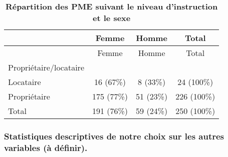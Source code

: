\documentclass[
]{article}
\begin{document}
\begin{longtable}[]{@{}lccc@{}}
\caption{\textbf{Répartition des PME suivant le niveau d'instruction et
le sexe}}\tabularnewline
\toprule\noalign{}
& Femme & Homme & Total \\
\midrule\noalign{}
\endfirsthead
\toprule\noalign{}
& Femme & Homme & Total \\
\midrule\noalign{}
\endhead
\bottomrule\noalign{}
\endlastfoot
Propriétaire/locataire & & & \\
Locataire & 16 (67\%) & 8 (33\%) & 24 (100\%) \\
Propriétaire & 175 (77\%) & 51 (23\%) & 226 (100\%) \\
Total & 191 (76\%) & 59 (24\%) & 250 (100\%) \\
\end{longtable}

\hypertarget{statistiques-descriptives-de-notre-choix-sur-les-autres-variables-uxe0-duxe9finir.}{%
\subsubsection{\texorpdfstring{\textbf{Statistiques descriptives de
notre choix sur les autres variables (à
définir).}}{Statistiques descriptives de notre choix sur les autres variables (à définir).}}\label{statistiques-descriptives-de-notre-choix-sur-les-autres-variables-uxe0-duxe9finir.}}
\end{document}
